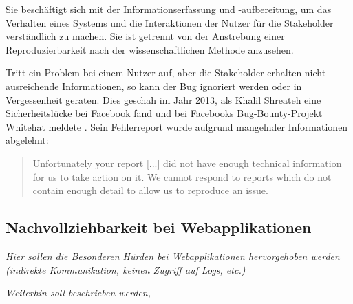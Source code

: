 	Sie beschäftigt sich mit der Informationserfassung und -aufbereitung, um das Verhalten eines Systems und die Interaktionen der Nutzer für die Stakeholder verständlich zu machen. Sie ist getrennt von der Anstrebung einer Reproduzierbarkeit nach der wissenschaftlichen Methode anzusehen.
	
	{\color{red}\textit{\lipsum[1]}}
	
	Tritt ein Problem bei einem Nutzer auf, aber die Stakeholder erhalten nicht ausreichende Informationen, so kann der Bug ignoriert werden oder in Vergessenheit geraten. Dies geschah im Jahr 2013, als Khalil Shreateh eine Sicherheitslücke bei Facebook fand und bei Facebooks Bug-Bounty-Projekt Whitehat meldete \cite{FacebookBugBounyHunt}. Sein Fehlerreport wurde aufgrund mangelnder Informationen abgelehnt:
	
	\begin{quotation}
	Unfortunately your report [...] did not have enough technical information for us to take action  on  it. We  cannot  respond  to  reports  which  do  not contain enough detail to allow us to reproduce an issue.
	\end{quotation}

\subsection{Nachvollziehbarkeit bei Webapplikationen}

	\textit{Hier sollen die Besonderen Hürden bei Webapplikationen hervorgehoben werden (indirekte Kommunikation, keinen Zugriff auf Logs, etc.)}

	\textit{Weiterhin soll beschrieben werden, }